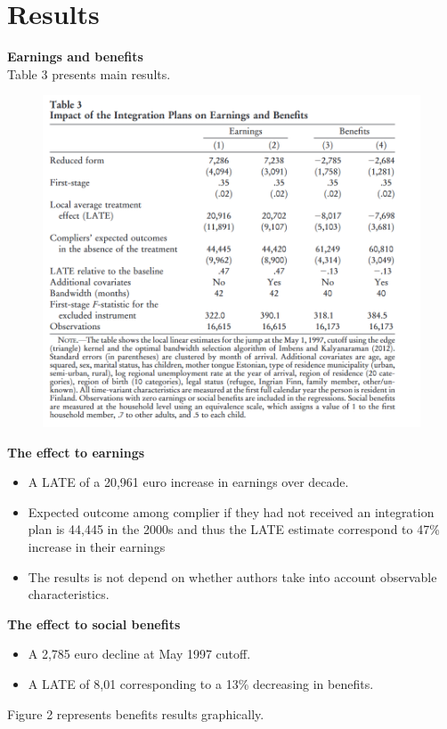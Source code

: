\documentclass[../root]{subfiles}
\begin{document}
    \section{Results}
    {\bf Earnings and benefits}　\\
    Table 3 presents main results.
    
    \begin{figure}[h]
        \includegraphics[width=12cm]{0703sugiyama/Table3.png}
    \end{figure}
    
    
    {\bf The effect to earnings } \\
    \begin{itemize}
        \item A LATE of a 20,961 euro  increase in earnings over decade.
        \item Expected outcome among complier if they had not received an integration plan is 44,445 in the 2000s and thus the LATE estimate correspond to 47\% increase in their earnings
        \item The results is not depend on whether authors take into account observable characteristics.  
    \end{itemize}
    
    
    {\bf The effect to social benefits}
    \begin{itemize}
        \item A 2,785 euro decline at May 1997 cutoff.
        \item A LATE of 8,01 corresponding to a 13\% decreasing in benefits.
    \end{itemize}
    Figure 2 represents benefits results graphically.
    
\end{document}
